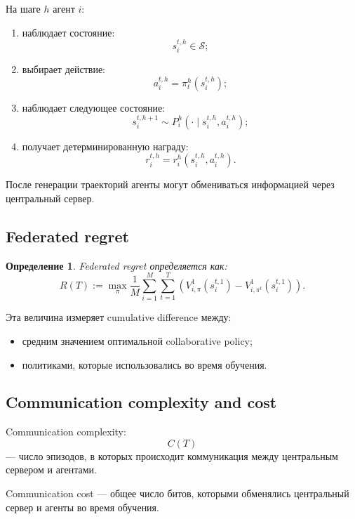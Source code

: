 \documentclass[12pt,a4paper]{article}
\newtheorem{definition}{Определение}
\begin{document}
На шаге $h$ агент $i$:

\begin{enumerate}
    \item наблюдает состояние:
    \[
    s_i^{t,h}\in\mathcal S;
    \]

    \item выбирает действие:
    \[
    a_i^{t,h}
    =
    \pi_t^h(s_i^{t,h});
    \]

    \item наблюдает следующее состояние:
    \[
    s_i^{t,h+1}
    \sim
    P_i^h(\cdot\mid s_i^{t,h},a_i^{t,h});
    \]

    \item получает детерминированную награду:
    \[
    r_i^{t,h}
    =
    r_i^h(s_i^{t,h},a_i^{t,h}).
    \]
\end{enumerate}

После генерации траекторий агенты могут обмениваться информацией через центральный сервер.

\subsection{Federated regret}

\begin{definition}
Federated regret определяется как:
\[
R(T)
:=
\max_\pi
\frac{1}{M}
\sum_{i=1}^{M}
\sum_{t=1}^{T}
\left(
V^1_{i,\pi}(s_i^{t,1})
-
V^1_{i,\pi^t}(s_i^{t,1})
\right).
\]
\end{definition}

Эта величина измеряет cumulative difference между:

\begin{itemize}
    \item средним значением оптимальной collaborative policy;
    \item политиками, которые использовались во время обучения.
\end{itemize}

\subsection{Communication complexity and cost}

Communication complexity:
\[
C(T)
\]
--- число эпизодов, в которых происходит коммуникация между центральным сервером и агентами.

Communication cost --- общее число битов, которыми обменялись центральный сервер и агенты во время обучения.
\end{document}
